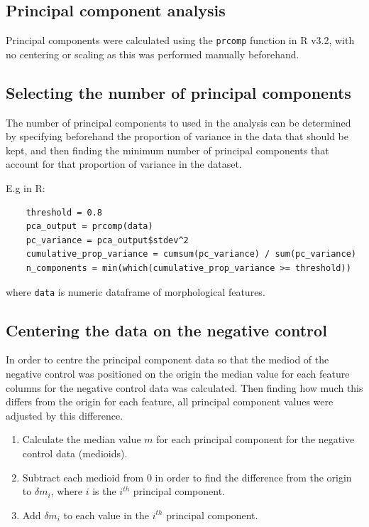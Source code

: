 \documentclass[a4paper,11pt,twoside,openright]{scrbook}
\begin{document}
\subsection{Principal component analysis}

Principal components were calculated using the \texttt{prcomp} function in R v3.2, with no centering or scaling as this was performed manually beforehand.

\subsection{Selecting the number of principal components}
The number of principal components to used in the analysis can be determined by specifying beforehand the proportion of variance in the data that should be kept, and then finding the minimum number of principal components that account for that proportion of variance in the dataset.

E.g in R:

\begin{verbatim}
    threshold = 0.8
    pca_output = prcomp(data)
    pc_variance = pca_output$stdev^2 
    cumulative_prop_variance = cumsum(pc_variance) / sum(pc_variance)
    n_components = min(which(cumulative_prop_variance >= threshold)) 
\end{verbatim}
where \texttt{data} is numeric dataframe of morphological features.


\subsection{Centering the data on the negative control}

In order to centre the principal component data so that the mediod of the negative control was positioned on the origin the median value for each feature columns for the negative control data was calculated.
Then finding how much this differs from the origin for each feature, all principal component values were adjusted by this difference.

\begin{enumerate}
    \item Calculate the median value $m$ for each principal component for the negative control data (medioids).
    \item Subtract each medioid from 0 in order to find the difference from the origin to $\delta m_i$, where $i$ is the $i^{th}$ principal component.
    \item Add $\delta m_i$ to each value in the $i^{th}$ principal component.
\end{enumerate}
\end{document}
